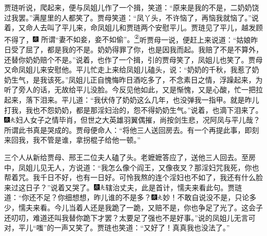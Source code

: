 贾琏听说，爬起来，便与凤姐儿作了一个揖，笑道：``原来是我的不是，二奶奶饶过我罢。''满屋里的人都笑了。贾母笑道：``凤丫头，不许恼了，再恼我就恼了。''说着，又命人去叫了平儿来，命凤姐儿和贾琏两个安慰平儿。贾琏见了平儿，越发顾不得了，{\includegraphics[width=3mm]{../Images/00004}  \kaishu 所谓``妻不如妾，妾不如偷''。}\href{../Text/part0048_split_000.html\#lnkback_2_a}{\textsuperscript{②}}听贾母一说，便赶上来说道：``姑娘昨日受了屈了，都是我的不是。奶奶得罪了你，也是因我而起。我赔了不是不算外，还替你奶奶赔个不是。''说着，也作了一个揖，引的贾母笑了，凤姐儿也笑了。贾母又命凤姐儿来安慰他。平儿忙走上来给凤姐儿磕头，说：``奶奶的千秋，我惹了奶奶生气，是我该死。''凤姐儿正自愧悔昨日酒吃多了，不念素日之情，浮躁起来，为听了旁人的话，无故给平儿没脸。今反见他如此，又是惭愧，又是心酸，忙一把拉起来，落下泪来。平儿道：``我伏侍了奶奶这么几年，也没弹我一指甲。就是昨儿打我，我也不怨奶奶，都是那淫妇治的，怨不得奶奶生气。''说着，也滴下泪来了。{\includegraphics[width=3mm]{../Images/00004}\includegraphics[width=3mm]{../Images/00012}\footnotesize \kaishu 妇人女子之情毕肖，但世之大英雄羽翼偶摧，尚按剑生悲，况阿凤与平儿哉？所谓此书真是哭成的。}贾母便命人：``将他三人送回房去。有一个再提此事，即刻来回我，我不管是谁，拿拐棍子给他一顿。''

三个人从新给贾母、邢王二位夫人磕了头。老嬷嬷答应了，送他三人回去。至房中，凤姐儿见无人，方说道：``我怎么像个阎王，又像夜叉？那淫妇咒我死，你也帮着咒。我千日不好，也有一日好。可怜我熬的连个淫妇也不如了，我还有什么脸来过这日子？''说着又哭了。{\includegraphics[width=3mm]{../Images/00004}\includegraphics[width=3mm]{../Images/00012}\footnotesize \kaishu 辖治丈夫，此是首计，懦夫来看此句。}贾琏道：``你还不足？你细想想，昨儿谁的不是多？{\includegraphics[width=3mm]{../Images/00004}\includegraphics[width=3mm]{../Images/00012}\footnotesize \kaishu 妙！不敢自说没不是，只论多少，懦夫来看。}今儿当着人还是我跪了一跪，又赔不是，你也争足了光了。这会子还叨叨，难道还叫我替你跪下才罢？太要足了强也不是好事。''说的凤姐儿无言可对，平儿``嗤''的一声又笑了。贾琏也笑道：``又好了！真真我也没法了。''

